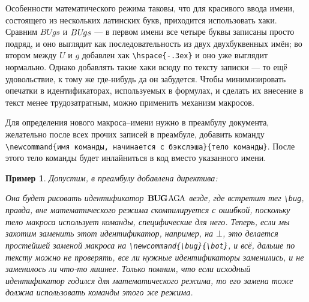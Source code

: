 \documentclass[14pt, russian]{scrartcl}
\newcounter{cExample}
\newtheorem{Example}{Пример}[cExample]
\begin{document}
Особенности математического режима таковы, что для красивого ввода имени, состоящего из нескольких латинских букв, приходится использовать хаки. Сравним $BUgs$ и $BU\hspace{-.3ex}gs$ --- в первом имени все четыре буквы записаны просто подряд, и оно выглядит как последовательность из двух двухбуквенных имён; во втором между $U$ и $g$ добавлен хак \texttt{\textbackslash hspace\{-.3ex\}} и оно уже выглядит нормально. Однако добавлять такие хаки всюду по тексту записки --- то ещё удовольствие, к тому же где-нибудь да он забудется. Чтобы минимизировать опечатки в идентификаторах, используемых в формулах, и сделать их внесение в текст менее трудозатратным, можно применить механизм макросов.

Для определения нового макроса--имени нужно в преамбулу документа, желательно после всех прочих записей в преамбуле, добавить команду \texttt{\textbackslash newcommand\{имя команды, начинается с бэкслэша\}\{тело команды\}}. После этого тело команды будет инлайниться в код вместо указанного имени. 

\begin{Example}
Допустим, в преамбулу добавлена директива:

\small
{}

\vspace{-1.5ex}

\normalsize
\justify Она будет рисовать идентификатор $\mathbf{B\hspace{-0.2ex}U\hspace{-0.2ex}G}\hspace{0.1ex}\mathrm{A\hspace{-0.2ex}G\hspace{-0.2ex}A}$ везде, где встретит тег \texttt{\textbackslash bug}, правда, вне математического режима скомпилируется с ошибкой, поскольку тело макроса использует команды, специфические для него. Теперь, если мы захотим заменить этот идентификатор, например, на $\bot$, это делается простейшей заменой макроса на \texttt{\textbackslash newcommand\{\textbackslash bug\}\{\textbackslash bot\}}, и всё, дальше по тексту можно не проверять, все ли нужные идентификаторы заменились, и не заменилось ли что-то лишнее. Только помним, что если исходный идентификатор годился для математического режима, то его замена тоже должна использовать команды этого же режима.
\end{Example}
\end{document}
